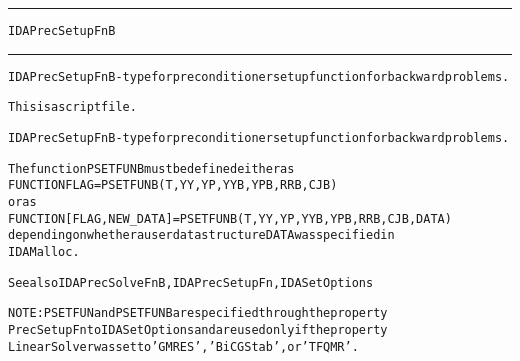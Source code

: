 \begin{samepage}
\hrule
\begin{center}
{\large \verb!IDAPrecSetupFnB!}
\label{p:IDAPrecSetupFnB}
\end{center}
\hrule\vspace{0.1in}



\begin{alltt}
IDAPrecSetupFnB - type for preconditioner setup function for backward problems.
\end{alltt}

\end{samepage}



\begin{samepage}


\begin{alltt}
This is a script file. 
\end{alltt}

\end{samepage}



\begin{alltt}
IDAPrecSetupFnB - type for preconditioner setup function for backward problems.

   The function PSETFUNB must be defined either as
        FUNCTION FLAG = PSETFUNB(T,YY,YP,YYB,YPB,RRB,CJB)
   or as
        FUNCTION [FLAG,NEW_DATA] = PSETFUNB(T,YY,YP,YYB,YPB,RRB,CJB,DATA)
   depending on whether a user data structure DATA was specified in
   IDAMalloc.

   See also IDAPrecSolveFnB, IDAPrecSetupFn, IDASetOptions

   NOTE: PSETFUN and PSETFUNB are specified through the property
   PrecSetupFn to IDASetOptions and are used only if the property
   LinearSolver was set to 'GMRES', 'BiCGStab', or 'TFQMR'.
\end{alltt}






\vspace{0.1in}